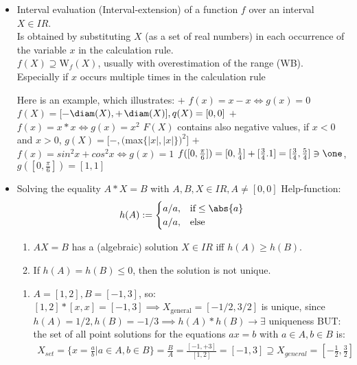 \begin{itemize}
	\item Interval evaluation (Interval-extension) of a function $f$ over an interval $X\in IR$.\\
	Is obtained by substituting $X$ (as a set of real numbers) in each occurrence of the variable $x$ in the calculation rule.\\
	$f(X)\supseteq $W$_f(X)$, usually with overestimation of the range (WB).\\
	Especially if $x$ occurs multiple times in the calculation rule
	\begin{*example}
		Here is an example, which illustrates:
		 $+$ $f(x)=x-x \iff g(x)=0$
		 $f(X)=[-$$\diam(X),+$$\diam(X)], q(X)=[0,0]$
		 $+$ $f(x)=x*x \iff g(x)=x^2$
		 $F(X)$ contains also negative values, if $x<0$ and $x>0$, 
		 $g(X)=[-,($max$\{|x|,|x|\})^2]$
		 $+$ $f(x)=sin^2x+cos^2x \iff g(x)=1$
		 $f([0,\frac{\pi}{6}])=[0,\frac{1}{4}]+[\frac{3}{4}.1]=[\frac{3}{4},\frac{5}{4}]\ni \one$, $g([0,\frac{\pi}{6}])=[1,1]$
	\end{*example}
	\item Solving the equality $A*X=B$ with $A,B,X\in IR, A\neq[0,0]$
	 Help-function: 
	 \begin{align*}
	 		h(A):= \begin{cases}
	 			a/a, & \text{if} \le\abs{a}\\
	 			a/a, & \text{else }
	 		\end{cases}
	 \end{align*}
	\begin{proposition}
		\begin{enumerate}
			\item $AX=B$ has a (algebraic) solution $X\in IR$ iff $h(A)\ge h(B)$.
			\item If $h(A)=h(B)\le 0$, then the solution is not unique.
		\end{enumerate}
	\end{proposition}
	\begin{*example}
			\begin{enumerate}
				\item $A=[1,2], B=[-1,3]$, so: $[1,2]\ast[x,x]=[-1,3] \implies X_{\text{general}}=[-1/2,3/2]$ is unique, since $h(A)=1/2, h(B)=-1/3 \implies h(A)\ast h(B) \to \exists$ uniqueness
				BUT: the set of all point solutions for the equations $ax=b$ with $a\in A, b\in B $ is:
				\begin{align*}
					X_{set}=\{x=\frac{a}{b}| a\in A, b\in B\}=\frac{B}{A}=\frac{[-1,+3]}{[1,2]}=[-1,3]\supseteq X_{general}=[-\frac{1}{2},\frac{3}{2}]

\end{align*}
\end{enumerate}
\end{*example}
\end{itemize}
